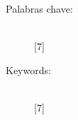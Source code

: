 \begin{multicols}{2}
\begin{description}
\item [Palabras chave:] \mbox{} \\[-20pt]
  [7]
\end{description}
\begin{description}
\item [Keywords:] \mbox{} \\[-20pt]
  [7]
\end{description}
\end{multicols}